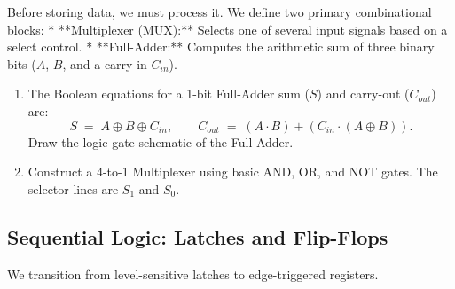 \documentclass[12pt, a4paper]{book}
\begin{document}
\begin{explobox}
Before storing data, we must process it. We define two primary combinational blocks:
* **Multiplexer (MUX):** Selects one of several input signals based on a select control.
* **Full-Adder:** Computes the arithmetic sum of three binary bits ($A$, $B$, and a carry-in $C_{in}$).
\begin{enumerate}[label=(\alph*), leftmargin=*]
  \item The Boolean equations for a 1-bit Full-Adder sum ($S$) and carry-out ($C_{out}$) are:
  \[
    S \;=\; A \oplus B \oplus C_{in}, \qquad C_{out} \;=\; (A \cdot B) + (C_{in} \cdot (A \oplus B)).
  \]
  Draw the logic gate schematic of the Full-Adder.
  \item Construct a 4-to-1 Multiplexer using basic AND, OR, and NOT gates. The selector lines are $S_1$ and $S_0$.
\end{enumerate}
\end{explobox}

\subsection{Sequential Logic: Latches and Flip-Flops}

We transition from level-sensitive latches to edge-triggered registers.
\end{document}
